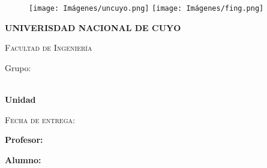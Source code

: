 \thispagestyle{empty}
			\begin{figure}[ht]
				\texttt{[image: Imágenes/uncuyo.png]}
				\label{escudoTecNM}
		   \endminipage
		   \minipage{\textwidth}
				\texttt{[image: Imágenes/fing.png]}
				\label{EscudoITCJ}
			\endminipage
		\end{figure}
		
		\vspace{0.1cm}
		
		\begin{center}
		    {\scshape\LARGE \textbf{UNIVERISDAD NACIONAL DE CUYO} \par}
			{\scshape\Large Facultad de Ingeniería \par}
	
            \vspace{0.75cm}
             {\Large \textbf{\myMateria}}

			\begin{center}
			
			
			{\Large Grupo:\myGrupo}
			\vspace{0.75cm}
				
			{\LARGE\bfseries \MyReport\\Unidad \myUnidad\par}
            \vspace{0.75cm}
            
		{\scshape\Large Fecha de entrega: \myDate\par}	
        \vspace{0.75cm}
	    \LARGE	{ \textbf{Profesor:}}\\
        \large		{ \myTeacher}
        
		\vspace{0.5cm}	
		
		\LARGE	{ \textbf{Alumno:}}
        
        \normalsize	 {\myName}

				\vspace{1.25cm}
				\vspace{0.9cm}
				
			\end{center}
	
		\end{center}